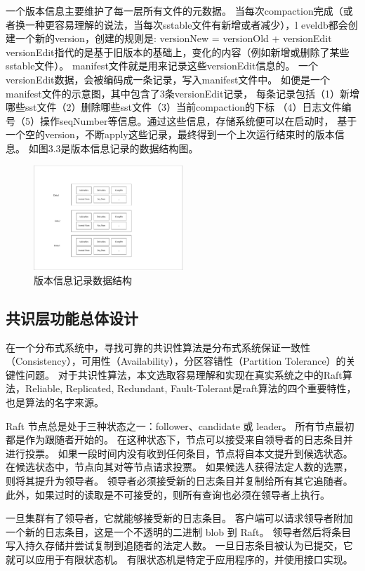 		一个版本信息主要维护了每一层所有文件的元数据。
		当每次compaction完成（或者换一种更容易理解的说法，当每次sstable文件有新增或者减少），l
		eveldb都会创建一个新的version，创建的规则是: versionNew = versionOld + versionEdit
		versionEdit指代的是基于旧版本的基础上，变化的内容（例如新增或删除了某些sstable文件）。
		manifest文件就是用来记录这些versionEdit信息的。
		一个versionEdit数据，会被编码成一条记录，写入manifest文件中。
		如便是一个manifest文件的示意图，其中包含了3条versionEdit记录，
		每条记录包括（1）新增哪些sst文件（2）删除哪些sst文件（3）当前compaction的下标
		（4）日志文件编号（5）操作seqNumber等信息。通过这些信息，存储系统便可以在启动时，
		基于一个空的version，不断apply这些记录，最终得到一个上次运行结束时的版本信息。
		如图3.3是版本信息记录的数据结构图。
		\begin{figure}[H]
			\centering
			\includegraphics[width=0.50\textwidth]{pdf/manifest.pdf}
			\caption{版本信息记录数据结构}
			\label{radds_storage_manifest}
		\end{figure}
		\subsection{共识层功能总体设计}	
		在一个分布式系统中，寻找可靠的共识性算法是分布式系统保证一致性（Consistency），可用性（Availability），分区容错性（Partition Tolerance）的关键性问题。
		对于共识性算法，本文选取容易理解和实现在真实系统之中的Raft算法，Reliable, Replicated, Redundant, Fault-Tolerant是raft算法的四个重要特性，也是算法的名字来源。
		
		Raft 节点总是处于三种状态之一：follower、candidate 或 leader。 
		所有节点最初都是作为跟随者开始的。 在这种状态下，节点可以接受来自领导者的日志条目并进行投票。 
		如果一段时间内没有收到任何条目，节点将自本文提升到候选状态。 在候选状态中，节点向其对等节点请求投票。 
		如果候选人获得法定人数的选票，则将其提升为领导者。 领导者必须接受新的日志条目并复制给所有其它追随者。 
		此外，如果过时的读取是不可接受的，则所有查询也必须在领导者上执行。
	
		一旦集群有了领导者，它就能够接受新的日志条目。 
		客户端可以请求领导者附加一个新的日志条目，这是一个不透明的二进制 blob 到 Raft。 
		领导者然后将条目写入持久存储并尝试复制到追随者的法定人数。 
		一旦日志条目被认为已提交，它就可以应用于有限状态机。 
		有限状态机是特定于应用程序的，并使用接口实现。
		
